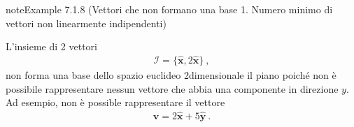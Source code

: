 \documentclass[letterpaper,10pt,italian]{jupyterBook}
\begin{document}
\begin{sphinxadmonition}{note}{Example 7.1.8 (Vettori che non formano una base \sphinxhyphen{} 1. Numero minimo di vettori non linearmente indipendenti)}



\sphinxAtStartPar
L’insieme di 2 vettori
\begin{equation*}
\begin{split}\mathcal{I} = \{ \hat{\mathbf{x}}, 2 \hat{\mathbf{x}} \} \ , \end{split}
\end{equation*}
\sphinxAtStartPar
non forma una base dello spazio euclideo 2\sphinxhyphen{}dimensionale \sphinxhyphen{} il piano \sphinxhyphen{} poiché non è possibile rappresentare nessun vettore che abbia una componente in direzione \(y\). Ad esempio, non è possible rappresentare il vettore
\begin{equation*}
\begin{split}\mathbf{v} = 2 \hat{\mathbf{x}} + 5 \hat{\mathbf{y}} \ .\end{split}
\end{equation*}\end{sphinxadmonition}
\label{ch/algebra/vector-algebra-def:example-9}
\end{document}
